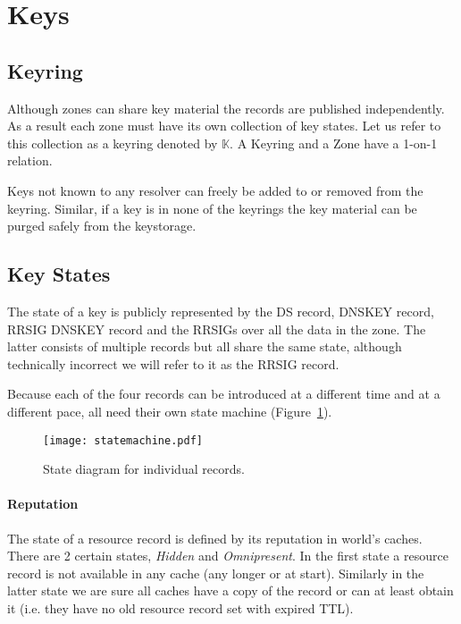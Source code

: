 \documentclass[twoside, a4paper]{article}
\begin{document}

\section{Keys}

\subsection{Keyring}

Although zones can share key material the records are published 
independently. As a result each zone must have its own collection of 
key states. Let us refer to this collection as a keyring denoted by 
$\mathbb{K}$. A Keyring and a Zone have a 1-on-1 relation.

Keys not known to any resolver can freely be added to or removed 
from the keyring. Similar, if a key is in none of the keyrings the 
key material can be purged safely from the keystorage.

\subsection{Key States} \label{sec:keystates}

The state of a key is publicly represented by the DS record, DNSKEY 
record, RRSIG DNSKEY record and the RRSIGs over all the data in the 
zone. The latter consists of multiple records but all share the same 
state, although technically incorrect we will refer to it as the 
RRSIG record.

Because each of the four records can be introduced at a different 
time and at a different pace, all need their own state machine 
(Figure~\ref{fig:statemachine}).

\begin{figure}[h]
	\centering
	\texttt{[image: statemachine.pdf]}
	\caption{State diagram for individual records.}
	\label{fig:statemachine}
\end{figure}


\paragraph{Reputation} The state of a resource record is defined by 
its reputation in world's caches. There are 2 certain states, \emph 
{Hidden} and \emph {Omnipresent}. In the first state a resource 
record is not available in any cache (any longer or at start). 
Similarly in the latter state we are sure all caches have a copy of 
the record or can at least obtain it (i.e. they have no old 
resource record set with expired TTL).
\end{document}
